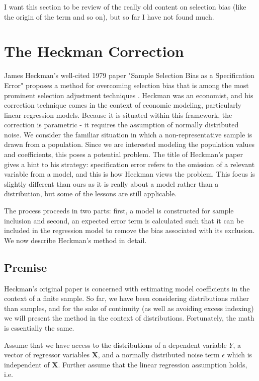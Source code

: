\documentclass[12pt,twoside]{reedthesis}
\theoremstyle{definition}
\begin{document}
I want this section to be review of the really old content on selection bias (like the origin of the term and so on), but so far I have not found much.

\section{The Heckman Correction}
James Heckman's well-cited 1979 paper "Sample Selection Bias as a Specification Error" proposes a method for overcoming selection bias that is among the most prominent selection adjustment techniques \citep{Heckman_1979}. Heckman was an economist, and his correction technique comes in the context of economic modeling, particularly linear regression models. Because it is situated within this framework, the correction is parametric - it requires the  assumption of normally distributed noise. We consider the familiar situation in which a non-representative sample is drawn from a population. Since we are interested modeling the population values and coefficients, this poses a potential problem. The title of Heckman's paper gives a hint to his strategy: specification error refers to the omission of a relevant variable from a model, and this is how Heckman views the problem. This focus is slightly different than ours as it is really about a model rather than a distribution, but some of the lessons are still applicable.

The process proceeds in two parts: first, a model is constructed for sample inclusion and second, an expected error term is calculated such that it can be included in the regression model to remove the bias associated with its exclusion. We now describe Heckman's method in detail.

\subsection{Premise}

Heckman's original paper is concerned with estimating model coefficients in the context of a finite sample. So far, we have been considering distributions rather than samples, and for the sake of continuity (as well as avoiding excess indexing) we will present the method in the context of distributions. Fortunately, the math is essentially the same.

Assume that we have access to the distributions of a dependent variable $Y$, a vector of regressor variables $\mathbf{X}$, and a normally distributed noise term $\epsilon$ which is independent of $\mathbf{X}$. Further assume that the linear regression assumption holds, i.e.
\end{document}
